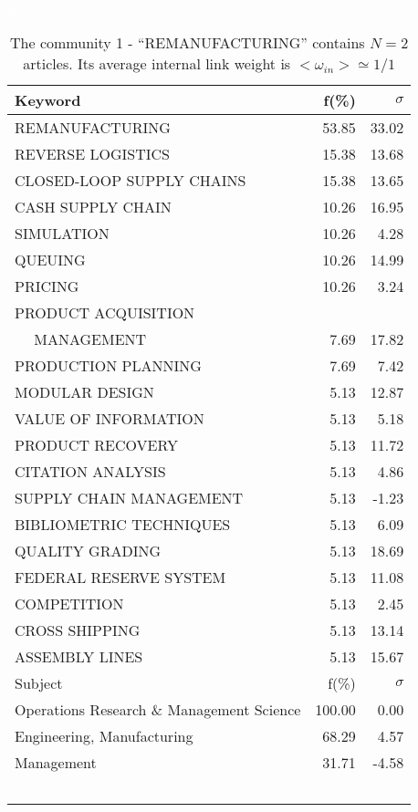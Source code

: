 \documentclass[a4paper,11pt]{report}
\begin{document}
\begin{landscape}
\clearpage

\begin{table}[!ht]
\caption{The community 1 - ``REMANUFACTURING'' contains $N = 2$ articles. Its average internal link weight is $<\omega_{in}> \simeq 1/1$ }
\textcolor{white}{aa}\\
{\scriptsize\begin{tabular}{|l r r|}
\hline
Keyword & f(\%) & $\sigma$\\
\hline
REMANUFACTURING & 53.85 & 33.02\\
REVERSE LOGISTICS & 15.38 & 13.68\\
CLOSED-LOOP SUPPLY CHAINS & 15.38 & 13.65\\
CASH SUPPLY CHAIN & 10.26 & 16.95\\
SIMULATION & 10.26 & 4.28\\
QUEUING & 10.26 & 14.99\\
PRICING & 10.26 & 3.24\\
PRODUCT ACQUISITION &  & \\
$\quad$ MANAGEMENT & 7.69 & 17.82\\
PRODUCTION PLANNING & 7.69 & 7.42\\
MODULAR DESIGN & 5.13 & 12.87\\
VALUE OF INFORMATION & 5.13 & 5.18\\
PRODUCT RECOVERY & 5.13 & 11.72\\
CITATION ANALYSIS & 5.13 & 4.86\\
SUPPLY CHAIN MANAGEMENT & 5.13 & -1.23\\
BIBLIOMETRIC TECHNIQUES & 5.13 & 6.09\\
QUALITY GRADING & 5.13 & 18.69\\
FEDERAL RESERVE SYSTEM & 5.13 & 11.08\\
COMPETITION & 5.13 & 2.45\\
CROSS SHIPPING & 5.13 & 13.14\\
ASSEMBLY LINES & 5.13 & 15.67\\
\hline
\hline
Subject & f(\%) & $\sigma$\\
\hline
Operations Research \& Management Science & 100.00 & 0.00\\
Engineering, Manufacturing & 68.29 & 4.57\\
Management & 31.71 & -4.58\\
 &  & \\
 &  & \\
 &  & \\
 &  & \\
 &  & \\

\end{tabular}}
\end{table}
\end{landscape}
\end{document}
